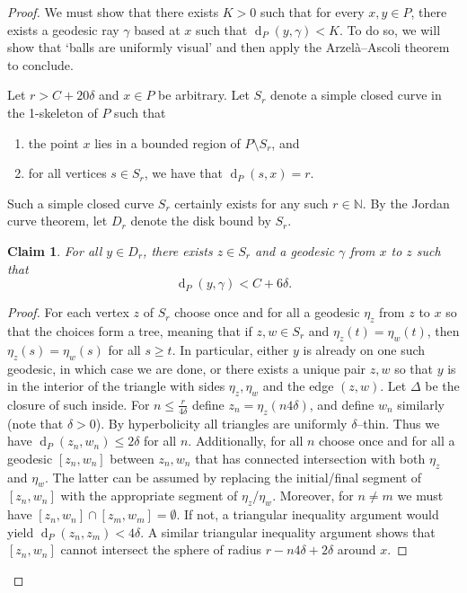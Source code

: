 \documentclass[10pt,a4paper]{amsart}
\newtheorem{claim}{Claim}
\newcommand{\N}{\mathbb{N}}
\DeclareMathOperator{\dist}{d}
\begin{document}
\begin{proof}
    We must show that there exists $K > 0$ such that for every $x, y \in P$, there exists a geodesic ray $\gamma$ based at $x$ such that $\dist_P(y,\gamma) < K$. 
    To do so, we will show that `balls are uniformly visual' and then apply the Arzel\`a--Ascoli theorem to conclude. 
    
	Let $r > C + 20 \delta$ and $x \in P$ be arbitrary. Let $S_r$ denote a simple closed curve in the 1-skeleton of $P$ such that 
    \begin{enumerate}
        \item the point $x$ lies in a bounded region of $P \setminus S_r$, and 

		\item for all vertices $s \in S_r$, we have that $\dist_P(s,x) = r$. 
    \end{enumerate}
	Such a simple closed curve $S_r$ certainly exists for any such $r\in\N$. 
    By the Jordan curve theorem, let $D_r$ denote the disk bound by $S_r$.  

    \begin{claim}\label{claim:spheres-are-visual}
        For all $y \in D_r$, there exists $z \in S_r$ and a geodesic $\gamma$ from $x$ to $z$ such that 
        $$
        \dist_P(y,\gamma) < C + 6\delta. 
        $$
    \end{claim}

    \begin{proof}
		For each vertex $z$ of $S_r$ choose once and for all a geodesic $\eta_z$ from $z$ to $x$ so that the choices form a tree, meaning that if $z,w\in S_r$ and $\eta_z(t) =\eta_w(t)$, then $\eta_z(s)  =\eta_w(s)$ for all $s\geq t$. In particular, either $y$ is already on one such geodesic, in which case we are done, or there exists a unique pair $z, w$ so that $y$ is in the interior of the triangle with sides $\eta_z, \eta_w$ and the edge $(z,w)$. Let $\Delta$ be the closure of such inside.  For $ n \leq \frac{r}{4\delta}$ define $z_n = \eta_z(n 4\delta)$, and define $w_n$ similarly (note that $\delta>0$). By hyperbolicity all triangles are uniformly $\delta$--thin. Thus we have $\dist_P(z_n, w_n) \leq  2\delta$ for all $n$. Additionally, for all $n$ choose once and for all a geodesic $[z_n, w_n]$ between $z_n, w_n$ that has connected intersection with both $\eta_z$ and $\eta_w$. The latter can be assumed by replacing the initial/final segment of $[z_n, w_n]$ with the appropriate segment of $\eta_z$/$\eta_w$. Moreover, for $n \neq m$ we must have $[z_n, w_n] \cap [z_m, w_m] = \emptyset$. If not, a triangular inequality argument would yield $\dist_P(z_n, z_m) < 4\delta$. A similar triangular inequality argument shows that $[z_n, w_n]$ cannot intersect the sphere of radius $ r- n4\delta + 2 \delta$ around $x$.    
        

\end{proof}
\end{proof}
\end{document}
